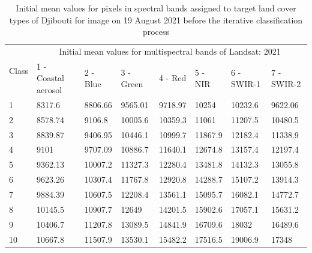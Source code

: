 \documentclass[jimaging,article,submit,pdftex,moreauthors]{Definitions/mdpi}
\begin{document}
\begin{table}[H]
  \centering
  \begin{tabularx}{\textwidth}{p{0.7cm}p{2.5cm}p{1.0cm}p{1.3cm}p{1.0cm}p{1.0cm}p{1.5cm}p{1.5cm}}
  \toprule
  \multirow{2}{*}{Class} & \multicolumn{7}{c}{Initial mean values for multispectral bands of Landsat: 2021} \\
     & 1 - Coastal aerosol & 2 - Blue & 3 - Green & 4 - Red & 5 - NIR & 6 - SWIR-1 & 7 - SWIR-2 \\
    \midrule
    1 & 8317.6 & 8806.66 & 9565.01 & 9718.97 & 10254 & 10232.6 & 9622.06 \\
    2 & 8578.74 & 9106.8 & 10005.6 & 10359.3 & 11061 & 11207.5 & 10480.5 \\
    3 & 8839.87 & 9406.95 & 10446.1 & 10999.7 & 11867.9 & 12182.4 & 11338.9 \\
    4 & 9101 & 9707.09 & 10886.7 & 11640.1 & 12674.8 & 13157.4 & 12197.4 \\
    5 & 9362.13 &10007.2 & 11327.3 & 12280.4 & 13481.8 & 14132.3 & 13055.8 \\
    6 & 9623.26 & 10307.4 & 11767.8 & 12920.8 & 14288.7 & 15107.2 & 13914.3 \\
    7 & 9884.39 & 10607.5 & 12208.4 & 13561.1 & 15095.7 & 16082.1 & 14772.7 \\
    8 & 10145.5 & 10907.7 & 12649 & 14201.5 & 15902.6 & 17057.1 & 15631.2 \\
    9 & 10406.7 & 11207.8 & 13089.5 & 14841.9 & 16709.6 & 18032 & 16489.6 \\
    10 & 10667.8 & 11507.9 & 13530.1 & 15482.2 & 17516.5 & 19006.9 & 17348 \\
\bottomrule
\end{tabularx}
  \caption{Initial mean values for pixels in spectral bands assigned to target land cover types of Djibouti for image on 19 August 2021 before the iterative classification process}
  \label{tabA3} 
\end{table}
\end{document}
